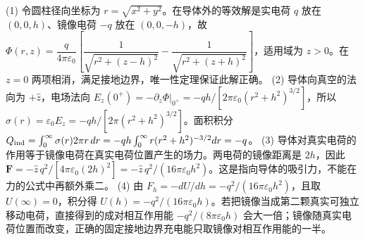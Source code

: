 (1) 令圆柱径向坐标为 \(r=\sqrt{x^2+y^2}\)。在导体外的等效解是实电荷 \(q\) 放在 \((0,0,h)\)、镜像电荷 \(-q\) 放在 \((0,0,-h)\)，故 \(\Phi(r,z)=\dfrac{q}{4\pi\varepsilon_0}\left[\dfrac1{\sqrt{r^2+(z-h)^2}}-\dfrac1{\sqrt{r^2+(z+h)^2}}\right]\)，适用域为 \(z>0\)。在 \(z=0\) 两项相消，满足接地边界，唯一性定理保证此解正确。
(2) 导体向真空的法向为 \(+\hat z\)，电场法向 \(E_z(0^+)=-\partial_z\Phi|_{0^+}=-qh/[2\pi\varepsilon_0(r^2+h^2)^{3/2}]\)，所以 \(\sigma(r)=\varepsilon_0E_z=-qh/[2\pi(r^2+h^2)^{3/2}]\)。面积积分 \(Q_{\rm ind}=\int_0^\infty\sigma(r)2\pi r\,dr=-qh\int_0^\infty r(r^2+h^2)^{-3/2}dr=-q\)。
(3) 导体对真实电荷的作用等于镜像电荷在真实电荷位置产生的场力。两电荷的镜像距离是 \(2h\)，因此 \(\boldsymbol F=-\hat z\,q^2/[4\pi\varepsilon_0(2h)^2]=-\hat z\,q^2/(16\pi\varepsilon_0h^2)\)。这是指向导体的吸引力，不能在力的公式中再额外乘二。
(4) 由 \(F_h=-dU/dh=-q^2/(16\pi\varepsilon_0h^2)\)，且取 \(U(\infty)=0\)，积分得 \(U(h)=-q^2/(16\pi\varepsilon_0h)\)。若把镜像当成第二颗真实可独立移动电荷，直接得到的成对相互作用能 \(-q^2/(8\pi\varepsilon_0h)\) 会大一倍；镜像随真实电荷位置而改变，正确的固定接地边界充电能只取镜像对相互作用能的一半。
